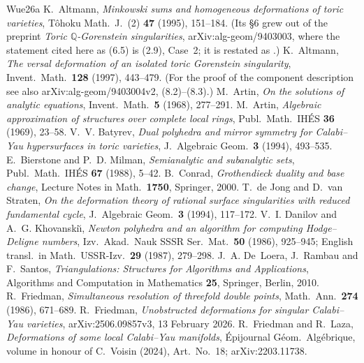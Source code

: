 \documentclass[11pt]{amsart}
\theoremstyle{definition}
\theoremstyle{remark}
\theoremstyle{plain}
\newcommand{\QQ}{\mathbb{Q}}
\begin{document}
\begin{thebibliography}{Wue26a}
 K.~Altmann, \emph{Minkowski sums and homogeneous
deformations of toric varieties}, T\^ohoku Math.\ J.\ (2) \textbf{47}
(1995), 151--184.  (Its \S6 grew out of the preprint \emph{Toric
$\QQ$-Gorenstein singularities}, arXiv:alg-geom/9403003, where the statement
cited here as (6.5) is (2.9), Case~2; it is restated as
\cite[(6.3)]{Altmann97}.)
 K.~Altmann, \emph{The versal deformation of an
isolated toric Gorenstein singularity}, Invent.\ Math.\ \textbf{128}
(1997), 443--479.  (For the proof of the component description see also
arXiv:alg-geom/9403004v2, (8.2)--(8.3).)
 M.~Artin, \emph{On the solutions of analytic
equations}, Invent.\ Math.\ \textbf{5} (1968), 277--291.
 M.~Artin, \emph{Algebraic approximation of
structures over complete local rings}, Publ.\ Math.\ IH\'ES
\textbf{36} (1969), 23--58.
 V.~V. Batyrev, \emph{Dual polyhedra and mirror
symmetry for Calabi--Yau hypersurfaces in toric varieties}, J.\ Algebraic
Geom.\ \textbf{3} (1994), 493--535.
 E.~Bierstone and P.~D. Milman, \emph{Semianalytic
and subanalytic sets}, Publ.\ Math.\ IH\'ES \textbf{67} (1988), 5--42.
 B.~Conrad, \emph{Grothendieck duality and base
change}, Lecture Notes in Math.\ \textbf{1750}, Springer, 2000.
 T.~de Jong and D.~van Straten, \emph{On the
deformation theory of rational surface singularities with reduced
fundamental cycle}, J.\ Algebraic Geom.\ \textbf{3} (1994), 117--172.
 V.~I. Danilov and A.~G. Khovanski\u{\i}, \emph{Newton
polyhedra and an algorithm for computing Hodge--Deligne numbers}, Izv.\ Akad.\
Nauk SSSR Ser.\ Mat.\ \textbf{50} (1986), 925--945; English transl.\ in
Math.\ USSR-Izv.\ \textbf{29} (1987), 279--298.
 J.~A. De~Loera, J.~Rambau and F.~Santos,
\emph{Triangulations: Structures for Algorithms and Applications},
Algorithms and Computation in Mathematics \textbf{25}, Springer, Berlin, 2010.
\bibitem[Fri86]{Friedman86} R.~Friedman, \emph{Simultaneous resolution of
threefold double points}, Math.\ Ann.\ \textbf{274} (1986), 671--689.
\bibitem[Fri26]{Friedman25} R.~Friedman, \emph{Unobstructed deformations for
singular Calabi--Yau varieties}, arXiv:2506.09857v3, 13 February 2026.
\bibitem[FL24]{FL22b} R.~Friedman and R.~Laza, \emph{Deformations of some
local Calabi--Yau manifolds}, \'Epijournal G\'eom.\ Alg\'ebrique,
volume in honour of C.~Voisin (2024), Art.~No.~18; arXiv:2203.11738.

\end{thebibliography}
\end{document}
